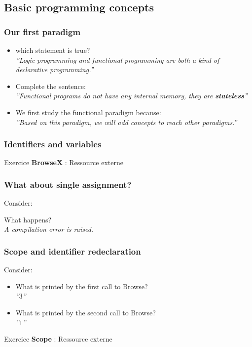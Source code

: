 \documentclass[fr,license=none]{../../../eplsummary}
\begin{document}
		\subsection{Basic programming concepts}
			\subsubsection*{Our first paradigm}
				\begin{itemize}
					\item which statement is true?\\
						\textit{''Logic programming and functional programming are both a kind of declarative programming.''}
					\item Complete the sentence:\\
						\textit{''Functional programs do not have any internal memory, they are \textbf{stateless}''}
					\item We first study the functional paradigm because:\\
						\textit{''Based on this paradigm, we will add concepts to reach other paradigms.''}
				\end{itemize}
			\subsubsection*{Identifiers and variables}
				Exercice \textbf{BrowseX} : Ressource externe\\
				
			\subsubsection*{What about single assignment?}
				Consider:
				
				What happens?\\
				\textit{A compilation error is raised.}
			\subsubsection*{Scope and identifier redeclaration}
				Consider:
				
				\begin{itemize}
					\item What is printed by the first call to Browse?\\
						\textit{''$3$''}
					\item What is printed by the second call to Browse?\\
						\textit{''$1$''}
				\end{itemize}
				Exercice \textbf{Scope} : Ressource externe\\
				
\end{document}
